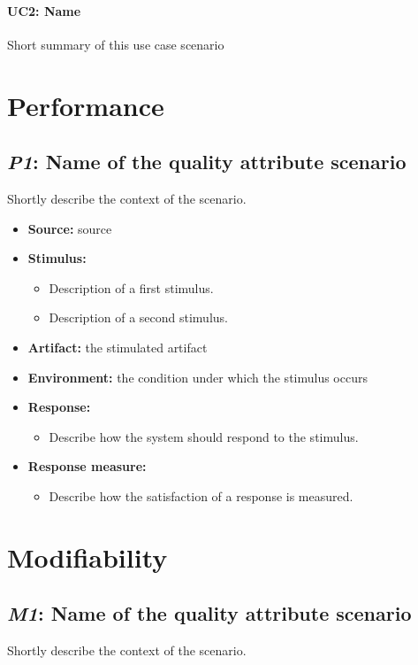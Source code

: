 \documentclass[english,peerreview]{sareport}
\begin{document}
\paragraph{UC2: Name}
Short summary of this use case scenario

\section{Performance}
\subsection{\emph{P1}: Name of the quality attribute scenario}
Shortly describe the context of the scenario.

\begin{itemize}
    \item \textbf{Source:} source
    \item \textbf{Stimulus:}
        \begin{itemize}
            \item Description of a first stimulus.
            \item Description of a second stimulus.
        \end{itemize}

    \item \textbf{Artifact:} the stimulated artifact
    \item \textbf{Environment:} the condition under which the stimulus occurs
    \item \textbf{Response:}
        \begin{itemize}
            \item Describe how the system should respond to the stimulus.
        \end{itemize}

    \item \textbf{Response measure:}
        \begin{itemize}
            \item Describe how the satisfaction of a response is measured.
        \end{itemize}
\end{itemize}

\section{Modifiability}
\subsection{\emph{M1}: Name of the quality attribute scenario}
Shortly describe the context of the scenario.
\end{document}
